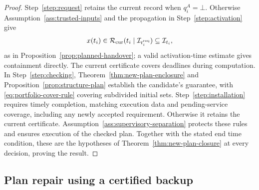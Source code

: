 \documentclass[final]{cas-sc}
\theoremstyle{definition}
\theoremstyle{plain}
\theoremstyle{definition}
\theoremstyle{plain}
\begin{document}
\begin{proof}
Step~\ref{step:request} retains the current record when
$q_i^{A}=\bot$. Otherwise Assumption~\ref{ass:trusted-inputs} and the
propagation in Step~\ref{step:activation} give
\[
x(t_i)\in\mathcal R_{\rm cur}(t_i\mid\mathcal I_{t_i^{\rm req}})
\subseteq\mathcal I_{t_i},
\]
as in Proposition~\ref{prop:planned-handover}; a valid activation-time estimate
gives containment directly. The current certificate covers deadlines
during computation. In Step~\ref{step:checking},
Theorem~\ref{thm:new-plan-enclosure} and Proposition~\ref{prop:structure-plan} establish
the candidate's guarantee, with \eqref{eq:portfolio-cover-rule} covering
subdivided initial sets. Step~\ref{step:installation} requires timely
completion, matching execution data and pending-service coverage,
including any newly accepted requirement. Otherwise it retains the
current certificate. Assumption~\ref{ass:supervisory-separation} protects these
rules and ensures execution of the checked plan. Together with the
stated end time condition, these are the hypotheses of
Theorem~\ref{thm:new-plan-closure} at every decision, proving the result.
\end{proof}

\subsection{Plan repair using a certified backup}
\label{sec:predictive-repair}
\end{document}
